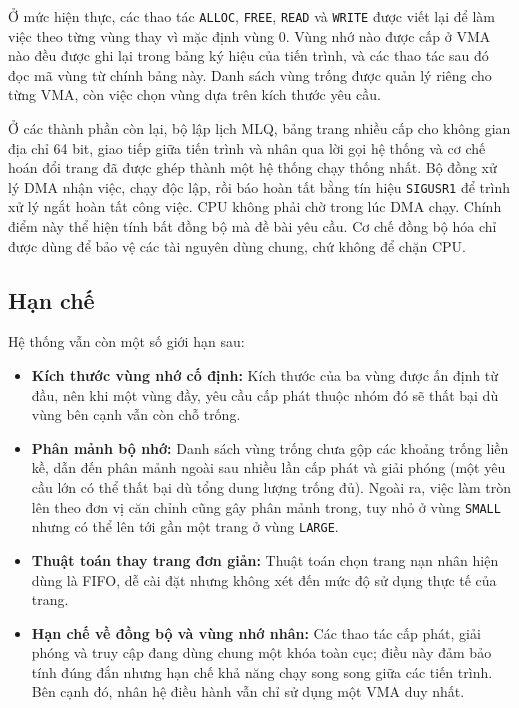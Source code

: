 \documentclass[12pt,a4paper]{article}
\begin{document}
    Ở mức hiện thực, các thao tác \texttt{ALLOC}, \texttt{FREE}, \texttt{READ} và \texttt{WRITE} được viết lại để làm việc theo từng vùng thay vì mặc định vùng 0. Vùng nhớ nào được cấp ở VMA nào đều được ghi lại trong bảng ký hiệu của tiến trình, và các thao tác sau đó đọc mã vùng từ chính bảng này. Danh sách vùng trống được quản lý riêng cho từng VMA, còn việc chọn vùng dựa trên kích thước yêu cầu.
    
    Ở các thành phần còn lại, bộ lập lịch MLQ, bảng trang nhiều cấp cho không gian địa chỉ 64 bit, giao tiếp giữa tiến trình và nhân qua lời gọi hệ thống và cơ chế hoán đổi trang đã được ghép thành một hệ thống chạy thống nhất. Bộ đồng xử lý DMA nhận việc, chạy độc lập, rồi báo hoàn tất bằng tín hiệu \texttt{SIGUSR1} để trình xử lý ngắt hoàn tất công việc. CPU không phải chờ trong lúc DMA chạy. Chính điểm này thể hiện tính bất đồng bộ mà đề bài yêu cầu. Cơ chế đồng bộ hóa chỉ được dùng để bảo vệ các tài nguyên dùng chung, chứ không để chặn CPU.
    
    \subsection*{Hạn chế}
    
    Hệ thống vẫn còn một số giới hạn sau:
    \begin{itemize}
        \item \textbf{Kích thước vùng nhớ cố định:} Kích thước của ba vùng được ấn định từ đầu, nên khi một vùng đầy, yêu cầu cấp phát thuộc nhóm đó sẽ thất bại dù vùng bên cạnh vẫn còn chỗ trống.
        \item \textbf{Phân mảnh bộ nhớ:} Danh sách vùng trống chưa gộp các khoảng trống liền kề, dẫn đến phân mảnh ngoài sau nhiều lần cấp phát và giải phóng (một yêu cầu lớn có thể thất bại dù tổng dung lượng trống đủ). Ngoài ra, việc làm tròn lên theo đơn vị căn chỉnh cũng gây phân mảnh trong, tuy nhỏ ở vùng \texttt{SMALL} nhưng có thể lên tới gần một trang ở vùng \texttt{LARGE}.
        \item \textbf{Thuật toán thay trang đơn giản:} Thuật toán chọn trang nạn nhân hiện dùng là FIFO, dễ cài đặt nhưng không xét đến mức độ sử dụng thực tế của trang.
        \item \textbf{Hạn chế về đồng bộ và vùng nhớ nhân:} Các thao tác cấp phát, giải phóng và truy cập đang dùng chung một khóa toàn cục; điều này đảm bảo tính đúng đắn nhưng hạn chế khả năng chạy song song giữa các tiến trình. Bên cạnh đó, nhân hệ điều hành vẫn chỉ sử dụng một VMA duy nhất.
    \end{itemize}
    
\end{document}
